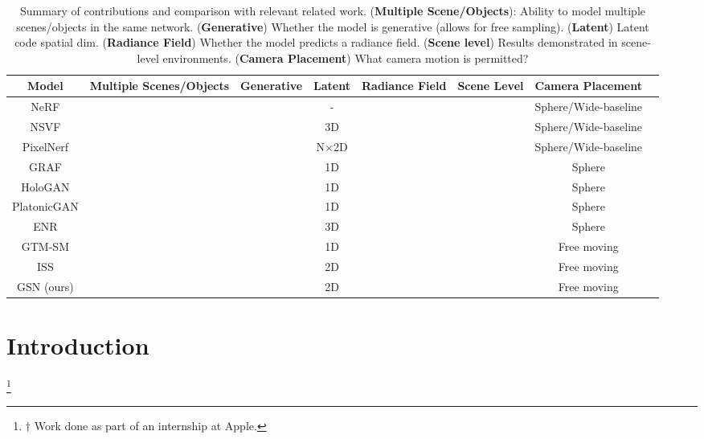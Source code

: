 \documentclass[10pt,twocolumn,letterpaper]{article}
\newcommand{\cmark}{\ding{51}}
\newcommand{\xmark}{\ding{55}}
\newcommand\blfootnote[1]{
  \begingroup
  \renewcommand\thefootnote{}\footnote{#1}
  \addtocounter{footnote}{-1}
  \endgroup
}
\begin{document}
\begin{table*}[t]
\small
    \centering
    \begin{tabular}{cccccccc}
    \toprule
    Model & Multiple Scenes/Objects & Generative & Latent  & Radiance Field & Scene Level & Camera Placement\\
    \midrule 

    NeRF \cite{nerf} & \xmark & \xmark & - & \cmark & \cmark & Sphere/Wide-baseline\\ 
    NSVF \cite{nsvf} & \xmark & \xmark & 3D & \cmark & \cmark & Sphere/Wide-baseline \\ 
    PixelNerf \cite{pixelnerf} & \cmark & \xmark & N$\times$2D & \cmark & \cmark & Sphere/Wide-baseline \\
    GRAF \cite{graf} & \cmark & \cmark & 1D & \cmark & \xmark & Sphere  \\ 
    HoloGAN \cite{hologan} & \cmark & \cmark & 1D & \xmark & \xmark & Sphere \\ 
    PlatonicGAN \cite{platonicgan} & \cmark & \xmark & 1D & \xmark & \xmark & Sphere \\ 
    ENR \cite{enr} & \cmark & \xmark  & 3D & \xmark & \xmark & Sphere \\ 
    GTM-SM \cite{gtmsm} & \cmark & \cmark & 1D & \xmark & \cmark & Free moving\\ 
    ISS \cite{iss} & \cmark & \xmark & 2D & \xmark & \cmark & Free moving\\ 
    GSN (ours)  & \cmark & \cmark & 2D & \cmark & \cmark & Free moving\\ 
    \bottomrule
    \end{tabular}
    \caption{Summary of contributions and comparison with relevant related work. (\textbf{Multiple Scene/Objects}): Ability to model multiple scenes/objects in the same network. (\textbf{Generative}) Whether the model is generative (\eg allows for free sampling).  (\textbf{Latent}) Latent code spatial dim. (\textbf{Radiance Field}) Whether the model predicts a radiance field. (\textbf{Scene level}) Results demonstrated in scene-level environments. (\textbf{Camera Placement}) What camera motion is permitted?}
    \label{tab:contributions}
\end{table*}
\section{Introduction}
\vspace{-1em}

\blfootnote{$\dagger$ Work done as part of an internship at Apple.}
\end{document}
